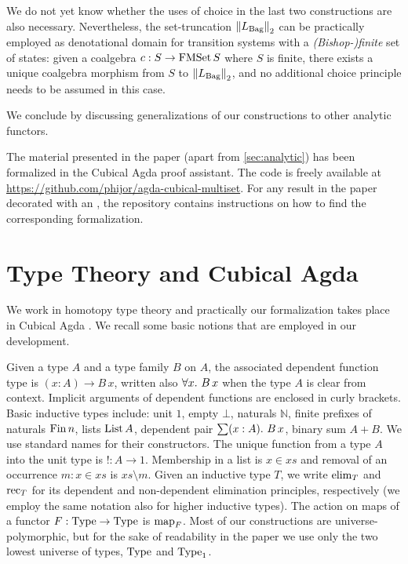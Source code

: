 \documentclass[final,a4paper,USenglish,cleveref]{lipics-v2021}
\newcommand*{\CodeRef}[1]{\href{README.html\##1}{\color{cyan}{\texttt{#1}}}}
\begin{document}
We do not yet know whether the uses of choice in the last two constructions are also necessary. Nevertheless, the set-truncation $\SetTrunc{\Lim{\Bag}}$ can be practically employed as denotational domain for transition systems with a \emph{(Bishop-)finite} set of states: given a coalgebra $c : S \to \FMSet S$ where $S$ is finite, there exists a unique coalgebra morphism from $S$ to $\SetTrunc{\Lim{\Bag}}$, and no additional choice principle needs to be assumed in this case. 

We conclude by discussing generalizations of our constructions to other analytic functors.

The material presented in the paper (apart from \cref{sec:analytic}) has been formalized in the Cubical Agda proof assistant.
The code is freely available at \url{https://github.com/phijor/agda-cubical-multiset}.
For any result in the paper decorated with an \CodeRef{Identifier},
the repository contains instructions on how to find the corresponding formalization.

\section{Type Theory and Cubical Agda}

We work in homotopy type theory \cite{HoTTBook} and practically our formalization takes place in Cubical Agda \cite{Vezzosi2019}. We recall some basic notions that are employed in our development.

Given a type $A$ and a type family $B$ on $A$, the associated dependent function type is $(x : A) \to B \, x$, written also $\forall x \mathpunct{.}\, B\,x$ when the type $A$ is clear from context. Implicit arguments of dependent functions are enclosed in curly brackets. Basic inductive types include: unit $1$, empty $\bot$, naturals $ℕ$, finite prefixes of naturals $\Fin n$, lists $\List A$, dependent pair $\sum (x : A) \mathpunct{.}\, B \, x$, binary sum $A + B$. We use standard names for their constructors. The unique function from a type $A$ into the unit type is $! : A \to 1$. Membership in a list is $x \in xs$ and removal of an occurrence $m : x \in xs$ is $xs \setminus m$. Given an inductive type $T$, we write $\Elim{T}$ and $\Rec{T}$ for its dependent and non-dependent elimination  principles, respectively (we employ the same notation also for higher inductive types). The action on maps of a functor $F : \Type \to \Type$ is $\Map{F}$. Most of our constructions are universe-polymorphic, but for the sake of readability in the paper we use only the two lowest universe of types, $\Type$ and $\Type_1$.
\end{document}
